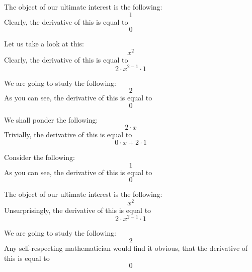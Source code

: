 \documentclass{article}
\begin{document}
The object of our ultimate interest is the following:
\begin{equation}
1 
\end{equation}
Clearly, the derivative of this is equal to
\begin{equation}
0 
\end{equation}

Let us take a look at this:
\begin{equation}
x ^{2 } 
\end{equation}
Clearly, the derivative of this is equal to
\begin{equation}
2 \cdot x ^{2 - 1 } \cdot 1 
\end{equation}

We are going to study the following:
\begin{equation}
2 
\end{equation}
As you can see, the derivative of this is equal to
\begin{equation}
0 
\end{equation}

We shall ponder the following:
\begin{equation}
2 \cdot x 
\end{equation}
Trivially, the derivative of this is equal to
\begin{equation}
0 \cdot x + 2 \cdot 1 
\end{equation}

Consider the following:
\begin{equation}
1 
\end{equation}
As you can see, the derivative of this is equal to
\begin{equation}
0 
\end{equation}

The object of our ultimate interest is the following:
\begin{equation}
x ^{2 } 
\end{equation}
Unsurprisingly, the derivative of this is equal to
\begin{equation}
2 \cdot x ^{2 - 1 } \cdot 1 
\end{equation}

We are going to study the following:
\begin{equation}
2 
\end{equation}
Any self-respecting mathematician would find it obvious, that the derivative of this is equal to
\begin{equation}
0 
\end{equation}
\end{document}
